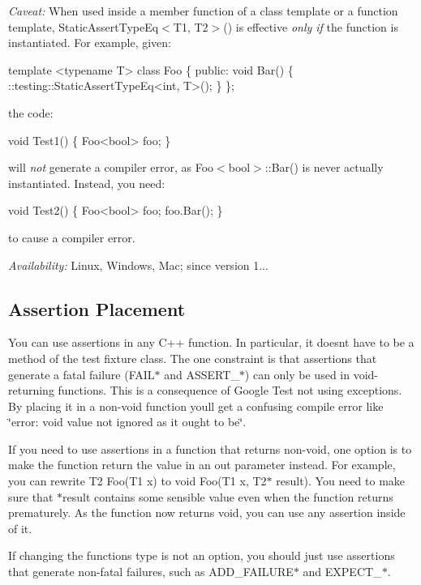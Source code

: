 {\itshape Caveat\+:} When used inside a member function of a class template or a function template, {\ttfamily Static\+Assert\+Type\+Eq$<$T1, T2$>$()} is effective {\itshape only if} the function is instantiated. For example, given\+: 
\begin{DoxyCode}
template <typename T> class Foo \{
 public:
  void Bar() \{ ::testing::StaticAssertTypeEq<int, T>(); \}
\};
\end{DoxyCode}
 the code\+: 
\begin{DoxyCode}
void Test1() \{ Foo<bool> foo; \}
\end{DoxyCode}
 will {\itshape not} generate a compiler error, as {\ttfamily Foo$<$bool$>$\+::\+Bar()} is never actually instantiated. Instead, you need\+: 
\begin{DoxyCode}
void Test2() \{ Foo<bool> foo; foo.Bar(); \}
\end{DoxyCode}
 to cause a compiler error.

{\itshape Availability\+:} Linux, Windows, Mac; since version 1...

\subsection*{Assertion Placement}

You can use assertions in any C++ function. In particular, it doesn\textquotesingle{}t have to be a method of the test fixture class. The one constraint is that assertions that generate a fatal failure ({\ttfamily F\+A\+I\+L$\ast$} and {\ttfamily A\+S\+S\+E\+R\+T\+\_\+$\ast$}) can only be used in void-\/returning functions. This is a consequence of Google Test not using exceptions. By placing it in a non-\/void function you\textquotesingle{}ll get a confusing compile error like {\ttfamily \char`\"{}error\+: void value not ignored as it ought to be\char`\"{}}.

If you need to use assertions in a function that returns non-\/void, one option is to make the function return the value in an out parameter instead. For example, you can rewrite {\ttfamily T2 Foo(\+T1 x)} to {\ttfamily void Foo(\+T1 x, T2$\ast$ result)}. You need to make sure that {\ttfamily $\ast$result} contains some sensible value even when the function returns prematurely. As the function now returns {\ttfamily void}, you can use any assertion inside of it.

If changing the function\textquotesingle{}s type is not an option, you should just use assertions that generate non-\/fatal failures, such as {\ttfamily A\+D\+D\+\_\+\+F\+A\+I\+L\+U\+R\+E$\ast$} and {\ttfamily E\+X\+P\+E\+C\+T\+\_\+$\ast$}.

